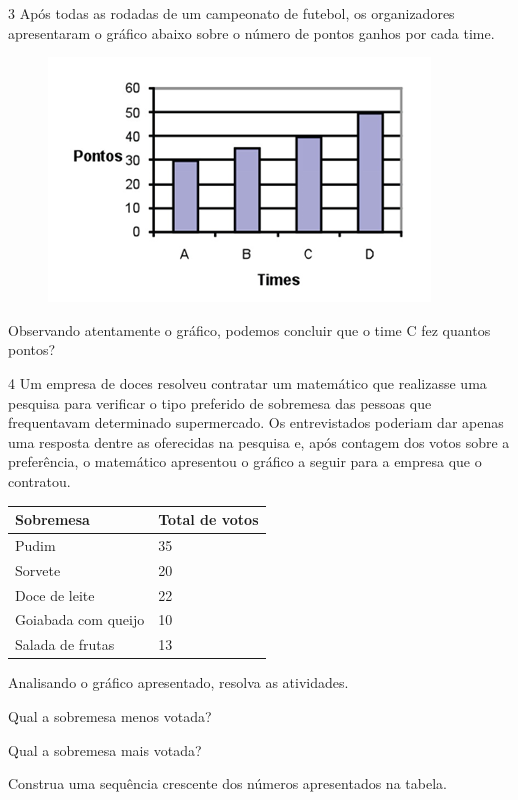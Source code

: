 \num{3} Após todas as rodadas de um campeonato de futebol, os organizadores
apresentaram o gráfico abaixo sobre o número de pontos ganhos por cada time.

\begin{figure}[htpb!]
\includegraphics[width=.5\textwidth]{./imgs/mat12.png}
\end{figure}

Observando atentamente o gráfico, podemos concluir que o time C fez quantos pontos?


\num{4} Um empresa de doces resolveu contratar um matemático que realizasse
uma pesquisa para verificar o tipo preferido de sobremesa das pessoas
que frequentavam determinado supermercado. Os entrevistados poderiam dar
apenas uma resposta dentre as oferecidas na pesquisa e, após contagem dos
votos sobre a preferência, o matemático apresentou o gráfico a seguir
para a empresa que o contratou.

\begin{longtable}[]{@{}ll@{}}
\toprule
Sobremesa & Total de votos\tabularnewline
\midrule
\endhead
Pudim & 35\tabularnewline
Sorvete & 20\tabularnewline
Doce de leite & 22\tabularnewline
Goiabada com queijo & 10\tabularnewline
Salada de frutas & 13\tabularnewline
\bottomrule
\end{longtable}

Analisando o gráfico apresentado, resolva as atividades.

\begin{escolha}
\item
  Qual a sobremesa menos votada?


\item
  Qual a sobremesa mais votada?


\item
  Construa uma sequência crescente dos números apresentados na tabela.


\item

\end{escolha}


